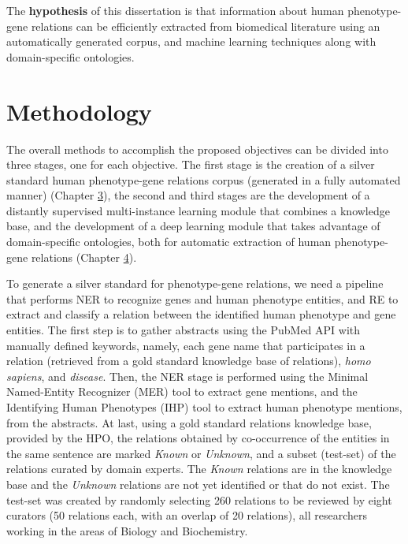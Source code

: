 The \textbf{hypothesis} of this dissertation is that information about human phenotype-gene relations can be efficiently extracted from biomedical literature using an automatically generated corpus, and machine learning techniques along with domain-specific ontologies.


\section{Methodology}

The overall methods to accomplish the proposed objectives can be divided into three stages, one for each objective. The first stage is the creation of a silver standard human phenotype-gene relations corpus (generated in a fully automated manner) (Chapter \hyperlink{3}{3}), the second and third stages are the development of a distantly supervised multi-instance learning module that combines a knowledge base, and the development of a deep learning module that takes advantage of domain-specific ontologies, both for automatic extraction of human phenotype-gene relations (Chapter \hyperlink{4}{4}). 

To generate a silver standard for phenotype-gene relations, we need a pipeline that performs NER to recognize genes and human phenotype entities, and RE to extract and classify a relation between the identified human phenotype and gene entities. The first step is to gather abstracts using the PubMed API with manually defined keywords, namely, each gene name that participates in a relation (retrieved from a gold standard knowledge base of relations), \textit{homo sapiens}, and \textit{disease}. Then, the NER stage is performed using the Minimal Named-Entity Recognizer (MER) tool \citep{MER} to extract gene mentions, and the Identifying Human Phenotypes (IHP) tool \citep{IHP} to extract human phenotype mentions, from the abstracts. At last, using a gold standard relations knowledge base, provided by the HPO, the relations obtained by co-occurrence of the entities in the same sentence are marked \textit{Known} or \textit{Unknown}, and a subset (test-set) of the relations curated by domain experts. The \textit{Known} relations are in the knowledge base and the \textit{Unknown} relations are not yet identified or that do not exist.
The test-set was created by randomly selecting 260 relations to be reviewed by eight curators (50 relations each, with an overlap of 20 relations), all researchers working in the areas of Biology and Biochemistry.


